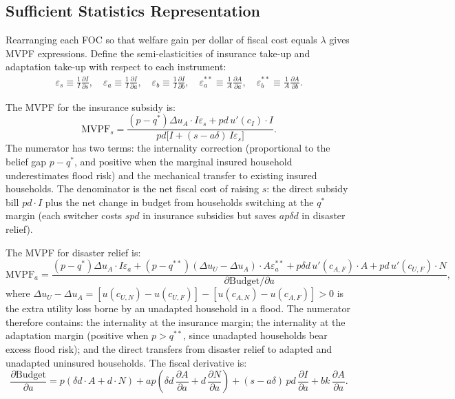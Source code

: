 \documentclass{article}
\begin{document}
\subsection{Sufficient Statistics Representation}

Rearranging each FOC so that welfare gain per dollar of fiscal cost equals $\lambda$ gives MVPF expressions. Define the semi-elasticities of insurance take-up and adaptation take-up with respect to each instrument:
\begin{align}
    \varepsilon_s \equiv \frac{1}{I}\frac{\partial I}{\partial s}, \quad
    \varepsilon_a \equiv \frac{1}{I}\frac{\partial I}{\partial a}, \quad
    \varepsilon_b \equiv \frac{1}{I}\frac{\partial I}{\partial b}, \quad
    \varepsilon_a^{**} \equiv \frac{1}{A}\frac{\partial A}{\partial a}, \quad
    \varepsilon_b^{**} \equiv \frac{1}{A}\frac{\partial A}{\partial b}.
\end{align}

The MVPF for the insurance subsidy is:
\begin{equation}
    \mathrm{MVPF}_s = \frac{(p-q^*)\Delta u_A\cdot I\varepsilon_s + pd\,u'(c_I)\cdot I}{pd\bigl[I + (s-a\delta)\,I\varepsilon_s\bigr]}.
    \label{eq:mvpf_s_disc}
\end{equation}
The numerator has two terms: the internality correction (proportional to the belief gap $p-q^*$, and positive when the marginal insured household underestimates flood risk) and the mechanical transfer to existing insured households. The denominator is the net fiscal cost of raising $s$: the direct subsidy bill $pd\cdot I$ plus the net change in budget from households switching at the $q^*$ margin (each switcher costs $spd$ in insurance subsidies but saves $ap\delta d$ in disaster relief).

The MVPF for disaster relief is:
\begin{equation}
    \mathrm{MVPF}_a = \frac{(p-q^*)\Delta u_A\cdot I\varepsilon_a
    + (p-q^{**})(\Delta u_U - \Delta u_A)\cdot A\varepsilon_a^{**}
    + p\delta d\,u'(c_{A,F})\cdot A + pd\,u'(c_{U,F})\cdot N}{\partial\mathrm{Budget}/\partial a},
    \label{eq:mvpf_a_disc}
\end{equation}
where $\Delta u_U - \Delta u_A = [u(c_{U,N})-u(c_{U,F})]-[u(c_{A,N})-u(c_{A,F})]>0$ is the extra utility loss borne by an unadapted household in a flood. The numerator therefore contains: the internality at the insurance margin; the internality at the adaptation margin (positive when $p > q^{**}$, since unadapted households bear excess flood risk); and the direct transfers from disaster relief to adapted and unadapted uninsured households. The fiscal derivative is:
\begin{equation}
    \frac{\partial\mathrm{Budget}}{\partial a} = p(\delta d\cdot A + d\cdot N)
    + ap\!\left(\delta d\,\frac{\partial A}{\partial a} + d\,\frac{\partial N}{\partial a}\right)
    + (s-a\delta)\,pd\,\frac{\partial I}{\partial a}
    + bk\,\frac{\partial A}{\partial a}. \label{eq:budget_a_disc}
\end{equation}
\end{document}
